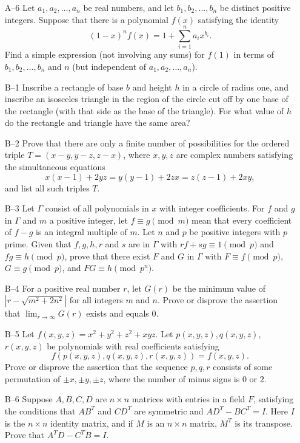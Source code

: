 \documentclass[amssymb,twocolumn,pra,10pt,aps]{revtex4-1}
\begin{document}
\begin{itemize}
\item[A--6]
Let $a_1, a_2, \dots, a_n$ be real numbers, and let $b_1, b_2, \dots,
b_n$ be distinct positive integers. Suppose that there is a polynomial
$f(x)$ satisfying the identity
\[
(1-x)^n f(x) = 1 + \sum_{i=1}^n a_i x^{b_i}.
\]
Find a simple expression (not involving any sums) for $f(1)$ in terms
of $b_1, b_2, \dots, b_n$ and $n$ (but independent of $a_1, a_2,
\dots, a_n$).

\item[B--1]
Inscribe a rectangle of base $b$ and height $h$ in a circle of radius
one, and inscribe an isosceles triangle in the region of the circle
cut off by one base of the rectangle (with that side as the base of
the triangle).
For what
value of $h$ do the rectangle and triangle have the same area?

\item[B--2]
Prove that there are only a finite number of possibilities for the
ordered triple $T=(x-y,y-z,z-x)$, where $x,y,z$ are complex numbers
satisfying the simultaneous equations
\[
x(x-1)+2yz = y(y-1)+2zx = z(z-1)+2xy,
\]
and list all such triples $T$.

\item[B--3]
Let $\Gamma$ consist of all polynomials in $x$ with integer
coefficients. For $f$ and $g$ in $\Gamma$ and $m$ a positive integer,
let $f \equiv g \pmod{m}$ mean that every coefficient of $f-g$ is an
integral multiple of $m$. Let $n$ and $p$ be positive integers with
$p$ prime. Given that $f,g,h,r$ and $s$ are in $\Gamma$ with
$rf+sg\equiv 1 \pmod{p}$ and $fg \equiv h \pmod{p}$, prove that there
exist $F$ and $G$ in $\Gamma$ with $F \equiv f \pmod{p}$, $G \equiv g
\pmod{p}$, and $FG \equiv h \pmod{p^n}$.

\item[B--4]
For a positive real number $r$, let $G(r)$ be the minimum value of $|r
- \sqrt{m^2+2n^2}|$ for all integers $m$ and $n$. Prove or disprove
the assertion that $\lim_{r\to \infty}G(r)$ exists and equals 0.

\item[B--5]
Let $f(x,y,z) = x^2+y^2+z^2+xyz$. Let $p(x,y,z), q(x,y,z)$, $r(x,y,z)$
be polynomials with real coefficients satisfying
\[
f(p(x,y,z), q(x,y,z), r(x,y,z)) = f(x,y,z).
\]
Prove or disprove the assertion that the sequence $p,q,r$ consists of
some permutation of $\pm x, \pm y, \pm z$, where the number of minus
signs is 0 or 2.

\item[B--6]
Suppose $A,B,C,D$ are $n \times n$ matrices with entries in a field
$F$, satisfying the conditions that $AB^T$ and $CD^T$ are symmetric and
$AD^T - BC^T = I$. Here $I$ is the $n \times n$ identity matrix, and
if $M$ is an $n \times n$ matrix, $M^T$ is its transpose. Prove that
$A^T D - C^T B = I$.

\end{itemize}
\end{document}
